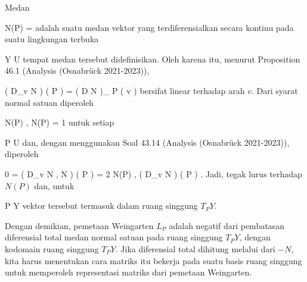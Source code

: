 {

Medan

\mavergleichskette
{\vergleichskette
{ N(P)
}
{ = }{ {  }
}
{  }{
}
{    }{
}
{   }{
}
}
{}{}{}
adalah suatu medan vektor yang terdiferensialkan secara kontinu pada suatu lingkungan terbuka

\mavergleichskette
{\vergleichskette
{ Y
}
{ \subseteq }{ U
}
{  }{
}
{    }{
}
{   }{
}
}
{}{}{}
tempat medan tersebut didefinisikan. Oleh karena itu, menurut
Proposition 46.1 (Analysis (Osnabrück 2021-2023)),

\mavergleichskettedisp
{\vergleichskette
{ \left(  D_{v}  N   \right) \left(   P  \right)
}
{ =} { \left(  D N   \right)_{ P } \left(  v  \right)
}
{ } {
}
{ } {
}
{ } {
}
}
{}{}{}
bersifat linear terhadap arah $v$. Dari syarat normal satuan diperoleh

\mavergleichskette
{\vergleichskette
{ \left\langle  N(P)  ,  N(P)   \right\rangle
}
{ = }{ 1
}
{  }{
}
{    }{
}
{   }{
}
}
{}{}{}
untuk setiap

\mavergleichskette
{\vergleichskette
{ P
}
{ \in }{ U
}
{  }{
}
{    }{
}
{   }{
}
}
{}{}{}
dan, dengan menggunakan
Soal 43.14 (Analysis (Osnabrück 2021-2023)), diperoleh

\mavergleichskettedisp
{\vergleichskette
{ 0
}
{ =} { \left(  D_{v}  \left\langle  N  ,  N  \right\rangle   \right) \left(   P  \right)
}
{ =} { 2 \left\langle  N(P)  ,  \left(  D_{v}  N   \right) \left(   P  \right)   \right\rangle
}
{ } {
}
{ } {
}
}
{}{}{.}
Jadi,
 tegak lurus terhadap $N(P)$ dan, untuk

\mavergleichskette
{\vergleichskette
{ P
}
{ \in }{ Y
}
{  }{
}
{    }{
}
{   }{
}
}
{}{}{}
vektor tersebut termasuk dalam ruang singgung $T_PY$.

}

Dengan demikian, pemetaan Weingarten $L_P$ adalah negatif dari pembatasan diferensial total medan normal satuan pada ruang singgung $T_PY$, dengan kodomain ruang singgung $T_PY$. Jika diferensial total dihitung melalui
dari $-N$, kita harus menentukan cara matriks itu bekerja pada suatu basis ruang singgung untuk memperoleh representasi matriks dari pemetaan Weingarten.



